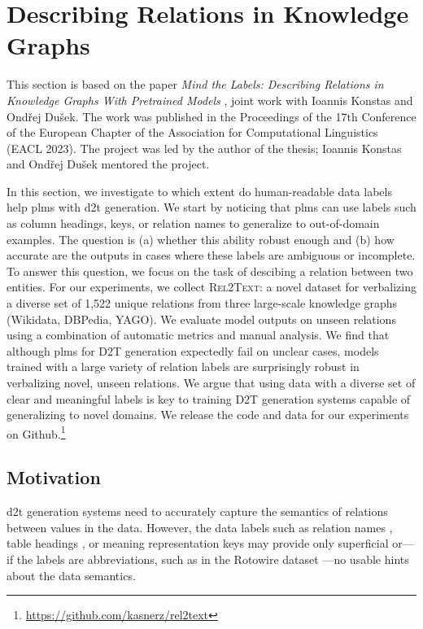 \section{Describing Relations in Knowledge Graphs}
\label{sec:rel2text}
\begin{refbox}
    This section is based on the paper \emph{Mind the Labels: Describing Relations in Knowledge Graphs With Pretrained Models} \cite{kasnerMindLabelsDescribing2022}, joint work with Ioannis Konstas and Ondřej Dušek. The work was published in the Proceedings of the 17th Conference of the European Chapter of the Association for Computational Linguistics (EACL 2023). The project was led by the author of the thesis; Ioannis Konstas and Ondřej Dušek mentored the project.
\end{refbox}
In this section, we investigate to which extent do human-readable data labels help \acp{plm} with \ac{d2t} generation. We start by noticing that \acp{plm} can use labels such as column headings, keys, or relation names to generalize to out-of-domain examples. The question is (a) whether this ability robust enough and (b) how accurate are the outputs in cases where these labels are ambiguous or incomplete. To answer this question, we focus on the task of descibing a relation between two entities. For our experiments, we collect \textsc{Rel2Text}: a novel dataset for verbalizing a diverse set of 1,522 unique relations from three large-scale knowledge graphs (Wikidata, DBPedia, YAGO). We evaluate model outputs on unseen relations using a combination of automatic metrics and manual analysis. We find that although \acp{plm} for D2T generation expectedly fail on unclear cases, models trained with a large variety of relation labels are surprisingly robust in verbalizing novel, unseen relations. We argue that using data with a diverse set of clear and meaningful labels is key to training D2T generation systems capable of generalizing to novel domains. We release the code and data for our experiments on Github.\footnote{\url{https://github.com/kasnerz/rel2text}}


% 

\subsection{Motivation}
\ac{d2t} generation systems need to accurately capture the semantics of relations between values in the data. However, the data labels such as relation names \cite{farber2018linked,haller2022analysis}, table headings \cite{parikhToTToControlledTableToText2020}, or meaning representation keys \cite{dusekEvaluatingStateoftheartEndtoEnd2020} may provide only superficial or---if the labels are abbreviations, such as in the Rotowire dataset \cite{wiseman2017challenges}---no usable hints about the data semantics.


